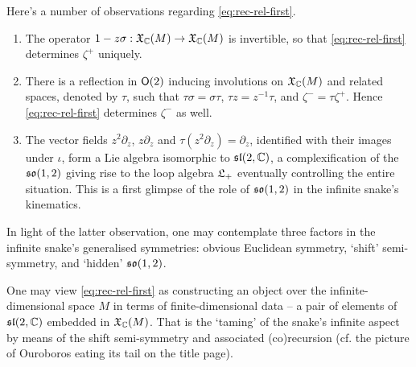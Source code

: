 Here's a number of observations regarding \eqref{eq:rec-rel-first}.
\begin{enumerate}
        \item 
                The operator $1 - z\sigma : \mathfrak{X}_{\mathbb{C}}(M)\to\mathfrak{X}_{\mathbb{C}}(M)$ is invertible,
                so that \eqref{eq:rec-rel-first} determines $\zeta^+$ uniquely.
        \item 
                There is a reflection in $\mathsf{O}(2)$ inducing involutions
                on $\mathfrak{X}_{\mathbb{C}}(M)$ and related spaces, denoted by $\tau$,
                such that $\tau\sigma=\sigma\tau$, $\tau z = z^{-1}\tau$, and
                $\zeta^- = \tau\zeta^+$. Hence \eqref{eq:rec-rel-first} determines $\zeta^-$ as well.
        \item 
                The vector fields $z^2\partial_z$, $z\partial_z$ and $\tau(z^2\partial_z) = \partial_z$,
                identified with their images under $\iota$,
                form a Lie algebra isomorphic to $\mathfrak{sl}(2,{\mathbb{C}})$, a complexification of the
                $\mathfrak{so}(1,2)$ giving rise to the loop algebra $\mathfrak{L}_+$ eventually controlling the 
                entire situation. This is a first glimpse of the role of $\mathfrak{so}(1,2)$ in the infinite
                snake's kinematics.
\end{enumerate}
In light of the latter observation, one may contemplate three factors in the infinite snake's generalised
symmetries: obvious Euclidean symmetry, `shift' semi-symmetry, and `hidden' $\mathfrak{so}(1,2)$. 

One may view \eqref{eq:rec-rel-first}
as constructing an object over the infinite-dimensional space $M$
in terms of finite-dimensional data -- a pair of elements of $\mathfrak{sl}(2,{\mathbb{C}})$ embedded in $\mathfrak{X}_{\mathbb{C}}(M)$.
That is the `taming' of the snake's infinite aspect by means of the shift semi-symmetry and associated (co)recursion 
(cf. the picture of Ouroboros eating its tail on the title page).

\endinput
